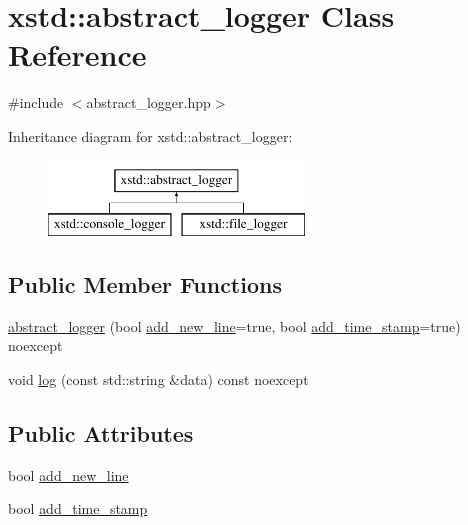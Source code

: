 \hypertarget{classxstd_1_1abstract__logger}{\section{xstd\-:\-:abstract\-\_\-logger Class Reference}
\label{classxstd_1_1abstract__logger}
}


{\ttfamily \#include $<$abstract\-\_\-logger.\-hpp$>$}

Inheritance diagram for xstd\-:\-:abstract\-\_\-logger\-:\begin{figure}[H]
\begin{center}
\leavevmode
\includegraphics[height=2.000000cm]{classxstd_1_1abstract__logger}
\end{center}
\end{figure}
\subsection*{Public Member Functions}
\begin{DoxyCompactItemize}
\item 
\hyperlink{classxstd_1_1abstract__logger_a57d17bcf4d3260fab819d98643671c78}{abstract\-\_\-logger} (bool \hyperlink{classxstd_1_1abstract__logger_a5216ec0a18fea2571db19d5a55d8700f}{add\-\_\-new\-\_\-line}=true, bool \hyperlink{classxstd_1_1abstract__logger_a534b4f6a3dcdd3b7f18abfcb1bb5b937}{add\-\_\-time\-\_\-stamp}=true) noexcept
\item 
void \hyperlink{classxstd_1_1abstract__logger_ad470970ac4726355f3423017f434ace8}{log} (const std\-::string \&data) const noexcept
\end{DoxyCompactItemize}
\subsection*{Public Attributes}
\begin{DoxyCompactItemize}
\item 
bool \hyperlink{classxstd_1_1abstract__logger_a5216ec0a18fea2571db19d5a55d8700f}{add\-\_\-new\-\_\-line}
\item 
bool \hyperlink{classxstd_1_1abstract__logger_a534b4f6a3dcdd3b7f18abfcb1bb5b937}{add\-\_\-time\-\_\-stamp}
\end{DoxyCompactItemize}
